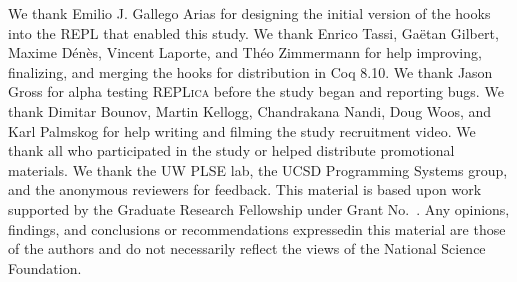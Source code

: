 \documentclass[sigplan,screen]{acmart}\settopmatter{}
\newcommand\toolname{\textsc{REPLica}\xspace}
\begin{document}



\maketitle







\begin{acks}
We thank Emilio J. Gallego Arias for designing the initial version of the hooks
into the REPL that enabled this study.
We thank Enrico Tassi, Ga\"{e}tan Gilbert, Maxime D\'{e}n\`{e}s,
Vincent Laporte, and Th\'{e}o Zimmermann for help improving, finalizing,
and merging the hooks for distribution in Coq 8.10.
We thank Jason Gross for alpha testing \toolname before the study began
and reporting bugs.
We thank Dimitar Bounov, Martin Kellogg, Chandrakana Nandi, Doug Woos,
and Karl Palmskog for help writing and filming the study recruitment video.
We thank all who participated in the study or helped distribute
promotional materials.
We thank the UW PLSE lab, the UCSD Programming Systems group,
and the anonymous reviewers for feedback.
This material is based upon work supported by the  Graduate Research Fellowship under Grant No.~. Any opinions, findings, and conclusions or recommendations expressedin this material are those of the authors and do not necessarily reflect the views of the National Science Foundation.
\end{acks}


\balance




\end{document}
